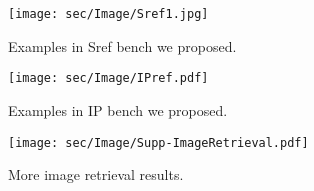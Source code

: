 


\begin{figure*}[htp]
    \centering
    \texttt{[image: sec/Image/Sref1.jpg]}
    \caption{Examples in Sref bench we proposed.}
    \label{supp:bench}
\end{figure*}

\begin{figure*}[htp]
    \centering
    \texttt{[image: sec/Image/IPref.pdf]}
    \caption{Examples in IP bench we proposed.}
    \label{supp:IP}
\end{figure*}

\begin{figure*}[htp]
    \centering
    \texttt{[image: sec/Image/Supp-ImageRetrieval.pdf]}
    \caption{More image retrieval results.}
    \label{supp:retrieval}
\end{figure*}

